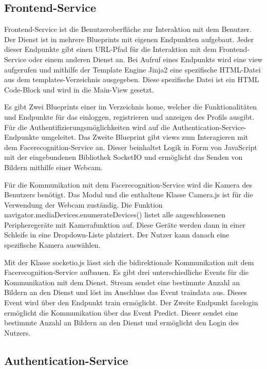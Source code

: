 \subsection{Frontend-Service}
Frontend-Service ist die Benutzeroberfläche zur Interaktion mit dem Benutzer.
Der Dienst ist in mehrere Blueprints mit eigenen Endpunkten aufgebaut.
Jeder dieser Endpunkte gibt einen URL-Pfad für die Interaktion mit dem Frontend-Service oder einem anderen Dienst an.
Bei Aufruf eines Endpunkts wird eine view aufgerufen und mithilfe der Template Engine Jinja2 eine spezifische HTML-Datei aus dem templates-Verzeichnis ausgegeben.
Diese spezifische Datei ist ein HTML Code-Block und wird in die Main-View gesetzt.

Es gibt Zwei Blueprints einer im Verzeichnis home, welcher die Funktionalitäten und Endpunkte für das einloggen, registrieren und anzeigen des Profils ausgibt.
Für die Authentifizierungsmöglichkeiten wird auf die Authentication-Service-Endpunkte umgeleitet.
Das Zweite Blueprint gibt views zum Interagieren mit dem Facerecognition-Service an.
Dieser beinhaltet Logik in Form von JavaScript mit der eingebundenen Bibliothek SocketIO und ermöglicht das Senden von Bildern mithilfe einer Webcam.

Für die Kommunikation mit dem Facerecognition-Service wird die Kamera des Benutzers benötigt.
Das Modul und die enthaltene Klasse Camera.js ist für die Verwendung der Webcam zuständig.
Die Funktion navigator.mediaDevices.enumerateDevices() listet alle angeschlossenen Peripheregeräte mit Kamerafunktion auf.
Diese Geräte werden dann in einer Schleife in eine Dropdown-Liste platziert.
Der Nutzer kann danach eine spezifische Kamera auswählen.

Mit der Klasse socketio.js lässt sich die bidirektionale Kommunikation mit dem Facerecognition-Service aufbauen.
Es gibt drei unterschiedliche Events für die Kommunikation mit dem Dienst.
Stream sendet eine bestimmte Anzahl an Bildern an den Dienst und löst im Anschluss das Event traindata aus.
Dieses Event wird über den Endpunkt train ermöglicht.
Der Zweite Endpunkt facelogin ermöglicht die Kommunikation über das Event Predict.
Dieser sendet eine bestimmte Anzahl an Bildern an den Dienst und ermöglicht den Login des Nutzers.



\subsection{Authentication-Service}




